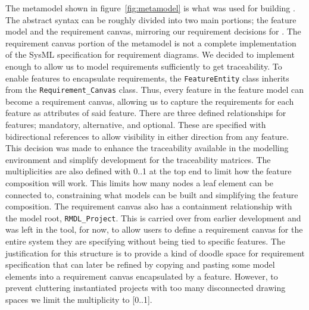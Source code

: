 The metamodel shown in figure~\ref{fig:metamodel} is what was used for building \tool. The abstract syntax can be roughly divided into two main portions; the feature model and the requirement canvas, mirroring our requirement decisions for \tool. The requirement canvas portion of the metamodel is not a complete implementation of the SysML specification for requirement diagrams. We decided to implement enough to allow us to model requirements sufficiently to get traceability. To enable features to encapsulate requirements, the \texttt{FeatureEntity} class inherits from the \texttt{Requirement\_Canvas} class. Thus, every feature in the feature model can become a requirement canvas, allowing us to capture the requirements for each feature as attributes of said feature. There are three defined relationships for features; mandatory, alternative, and optional. These are specified with bidirectional references to allow visibility in either direction from any feature. This decision was made to enhance the traceability available in the modelling environment and simplify development for the traceability matrices. The multiplicities are also defined with 0..1 at the top end to limit how the feature composition will work. This limits how many nodes a leaf element can be connected to, constraining what models can be built and simplifying the feature composition. The requirement canvas also has a containment relationship with the model root, \texttt{RMDL\_Project}. This is carried over from earlier development and was left in the tool, for now, to allow users to define a requirement canvas for the entire system they are specifying without being tied to specific features. The justification for this structure is to provide a kind of doodle space for requirement specification that can later be refined by copying and pasting some model elements into a requirement canvas encapsulated by a feature. However, to prevent cluttering instantiated projects with too many disconnected drawing spaces we limit the multiplicity to [0..1].

